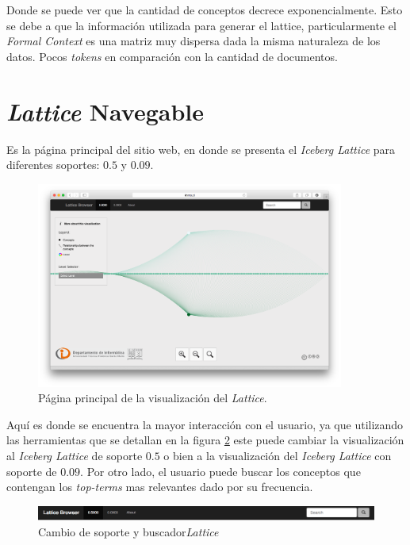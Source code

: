 \documentclass[12pt,oneside,letterpaper]{book}
\newcommand{\eng}[1]{\textit{#1}\xspace}			%
\theoremstyle{definition}
\begin{document}
Donde se puede ver que la cantidad de conceptos decrece exponencialmente. Esto se debe a que la información utilizada para generar el lattice, particularmente el \eng{Formal Context} es una matriz muy dispersa dada la misma naturaleza de los datos. Pocos \eng{tokens} en comparación con la cantidad de documentos.

\section{\eng{Lattice} Navegable}
Es la página principal del sitio web, en donde se presenta el \eng{Iceberg Lattice} para diferentes soportes: $0.5$ y $0.09$.

\begin{figure}[h!]
	\centering
	\includegraphics[width=0.90\textwidth]{images/results_1.png}
	\caption{Página principal de la visualización del \eng{Lattice}.}
	\label{fig:results_1}
\end{figure} 

Aquí es donde se encuentra la mayor interacción con el usuario, ya que utilizando las herramientas que se detallan en la figura \ref{fig:results_2} este puede cambiar la visualización al \eng{Iceberg Lattice} de soporte $0.5$ o bien a la visualización del \eng{Iceberg Lattice} con soporte de $0.09$. Por otro lado, el usuario puede buscar los conceptos que contengan los \eng{top-terms} mas relevantes dado por su frecuencia.

\begin{figure}[h!]
	\centering
	\includegraphics[width=1\textwidth]{images/results_2.png}
	\caption{Cambio de soporte y buscador\eng{Lattice}}
	\label{fig:results_2}
\end{figure}
\end{document}
